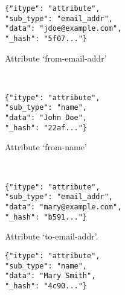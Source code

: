 \begin{figure}[!ht]
    \footnotesize
    \begin{minipage}{.29\textwidth}
        \begin{subfigure}{\linewidth}

            \begin{verbatim}
{"itype": "attribute",
"sub_type": "email_addr",
"data": "jdoe@example.com",
"_hash": "5f07..."}
            \end{verbatim}

            \caption{Attribute `from-email-addr'}
            \label{fig:aef}
        \end{subfigure}\\[0.5\baselineskip]
        \begin{subfigure}{\linewidth}

            \begin{verbatim}
{"itype": "attribute",
"sub_type": "name",
"data": "John Doe",
"_hash": "22af..."}
            \end{verbatim}

            \caption{Attribute `from-name'}
            \label{fig:anf}
        \end{subfigure}\\[0.5\baselineskip]
        \begin{subfigure}{\linewidth}

            \begin{verbatim}
{"itype": "attribute",
"sub_type": "email_addr",
"data": "mary@example.com",
"_hash": "b591..."}
            \end{verbatim}

            \caption{Attribute `to-email-addr'.}
            \label{fig:aet}
        \end{subfigure}
    \end{minipage}%
    \hfill
    \begin{minipage}{.29\textwidth}
        \begin{subfigure}{\linewidth}

            \begin{verbatim}
{"itype": "attribute",
"sub_type": "name",
"data": "Mary Smith",
"_hash": "4c90..."}
            \end{verbatim}


\end{subfigure}
\end{minipage}
\end{figure}
